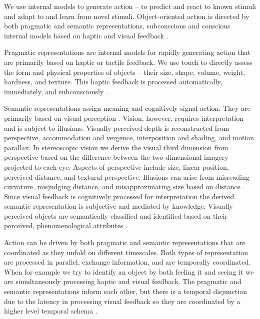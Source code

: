 \documentclass{article}
\begin{document}
We use internal models to generate action -- to predict and react to known stimuli and adapt to and learn from novel stimuli. 
Object-oriented action is directed by both pragmatic and semantic representations, subconscious and conscious internal models based on haptic and visual feedback \citep{Jeannerod1997}. 

Pragmatic representations are internal models for rapidly generating action
that are primarily based on haptic or tactile feedback. 
We use touch to directly assess the form and physical properties of objects -- their size, shape, volume, weight, hardness, and texture. 
This haptic feedback is processed automatically, immediately, and subconsciously \citep{Jeannerod1997}. 

Semantic representations assign meaning and cognitively signal action. 
They are primarily based on visual perception \citep{Jeannerod1997}.
Vision, however, requires interpretation and is subject to illusions.
Visually perceived depth is reconstructed from perspective, accommodation and vergence, interposition and shading, and motion parallax.
In stereoscopic vision we derive the visual third dimension from perspective based on the difference between the two-dimensional imagery projected to each eye. 
Aspects of perspective include size, linear position, perceived distance, and textural perspective. 
Illusions can arise from misreading curvature, misjudging distance, and misapproximating size based on distance \citep{Howard2012b,Howard2012c, Jeannerod1997}. 
Since visual feedback is cognitively processed for interpretation the derived semantic representation is subjective and mediated by knowledge. 
Visually perceived objects are semantically classified and identified based on their perceived, phenomenological attributes \citep{Jeannerod1997}. 

Action can be driven by both pragmatic and semantic representations that are coordinated as they unfold on different timescales. 
Both types of representation are processed in parallel, exchange information, and are temporally coordinated. 
When for example we try to identify an object by both feeling it and seeing it we are simultaneously processing haptic and visual feedback. The pragmatic and semantic representations inform each other, but there is a temporal disjunction due to the latency in processing visual feedback so they are coordinated by a higher level temporal schema \citep{Jeannerod1997}. 
\end{document}
